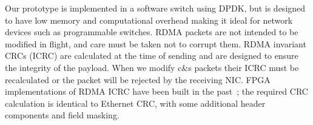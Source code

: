 Our prototype is implemented in a software switch using DPDK, but is
designed to have low memory and computational overhead making it ideal
for network devices such as programmable switches.  RDMA packets are
not intended to be modified in flight, and care must be taken not to
corrupt them. RDMA invariant CRCs (ICRC) are calculated at the time of
sending and are designed to ensure the integrity of the payload. When
we modify c\&s packets their ICRC must be recalculated or the packet
will be rejected by the receiving NIC. FPGA implementations of RDMA
ICRC have been built in the past~\cite{Mansour_2019}; the required CRC
calculation is identical to Ethernet CRC, with some additional header
components and field masking.


